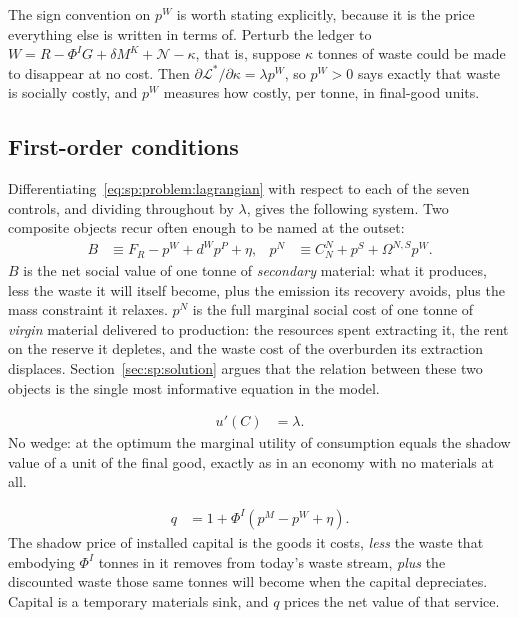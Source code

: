The sign convention on $p^W$ is worth stating explicitly, because it is the price everything else
is written in terms of. Perturb the ledger to $W=R-\Phi^IG+\delta M^K+\mathcal N-\kappa$, that is,
suppose $\kappa$ tonnes of waste could be made to disappear at no cost. Then
$\partial\mathcal L^*/\partial\kappa=\lambda p^W$, so $p^W>0$ says exactly that waste is socially
costly, and $p^W$ measures how costly, per tonne, in final-good units.


\subsection{First-order conditions}\label{sec:sp:problem:foc}

Differentiating~\eqref{eq:sp:problem:lagrangian} with respect to each of the seven controls, and
dividing throughout by $\lambda$, gives the following system. Two composite objects recur often
enough to be named at the outset:
\begin{align}
B &\equiv F_R-p^W+d^Wp^P+\eta,
&
p^N &\equiv C^N_N+p^S+\Omega^{N,S}p^W .
\label{eq:sp:problem:B}
\end{align}
$B$ is the net social value of one tonne of \emph{secondary} material: what it produces, less the
waste it will itself become, plus the emission its recovery avoids, plus the mass constraint it
relaxes. $p^N$ is the full marginal social cost of one tonne of \emph{virgin} material delivered to
production: the resources spent extracting it, the rent on the reserve it depletes, and the waste
cost of the overburden its extraction displaces. Section~\ref{sec:sp:solution} argues that the
relation between these two objects is the single most informative equation in the model.

\begin{align}
u'\!\left(C\right) &= \lambda .
\label{eq:sp:foc:C}
\end{align}
No wedge: at the optimum the marginal utility of consumption equals the shadow value of a unit of
the final good, exactly as in an economy with no materials at all.

\begin{align}
q &= 1+\Phi^I\left(p^M-p^W+\eta\right).
\label{eq:sp:foc:I}
\end{align}
The shadow price of installed capital is the goods it costs, \emph{less} the waste that embodying
$\Phi^I$ tonnes in it removes from today's waste stream, \emph{plus} the discounted waste those same
tonnes will become when the capital depreciates. Capital is a temporary materials sink, and $q$
prices the net value of that service.


